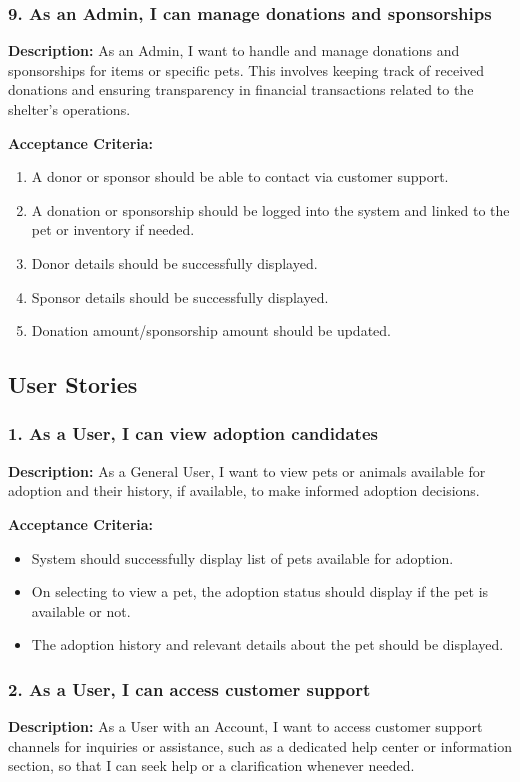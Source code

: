 \subsubsection*{9. As an Admin, I can manage donations and sponsorships}
\textbf{Description:} As an Admin, I want to handle and manage donations and sponsorships for items or specific pets. This involves keeping track of received donations and ensuring transparency in financial transactions related to the shelter's operations.

\textbf{Acceptance Criteria:}
\begin{enumerate}
    \item A donor or sponsor should be able to contact via customer support.
    \item A donation or sponsorship should be logged into the system and linked to the pet or inventory if needed.
    \item Donor details should be successfully displayed.
    \item Sponsor details should be successfully displayed.
    \item Donation amount/sponsorship amount should be updated.
\end{enumerate}


\subsection{User Stories}
\subsubsection*{1. As a User, I can view adoption candidates} 
    \textbf{Description:} As a General User, I want to view pets or animals available for adoption and their history, if available, to make informed adoption decisions. 
    
    \textbf{Acceptance Criteria:}
    \begin{itemize}
       \item System should successfully display list of pets available for adoption.
       \item On selecting to view a pet, the adoption status should display if the pet is available or not.
       \item The adoption history and relevant details about the pet should be displayed.
    \end{itemize}
    
\subsubsection*{2. As a User, I can access customer support} 
    \textbf{Description:} As a User with an Account, I want to access customer support channels for inquiries or assistance, such as a dedicated help center or information section, so that I can seek help or a clarification whenever needed. 
    
